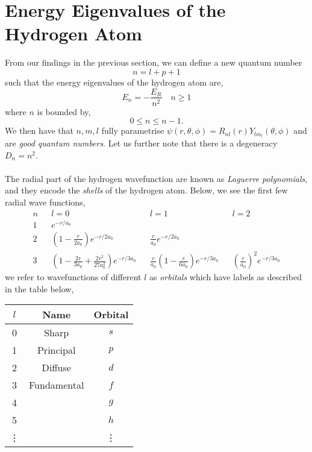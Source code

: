 \documentclass{book}
\begin{document}
\section{Energy Eigenvalues of the Hydrogen Atom}
From our findings in the previous section, we can define a new quantum number
\begin{equation}
	n = l + p + 1
\end{equation}
such that the energy eigenvalues of the hydrogen atom are,
\begin{equation}
	E_n = -\frac{E_R}{n^2} \hspace{1em} n \geq 1
\end{equation}
where $n$ is bounded by,
\begin{equation}
	 0 \leq n \leq n - 1.
\end{equation}
We then have that $n,m,l$ fully parametrise $\psi(r,\theta,\phi) = R_{nl}(r)Y_{lm_l}(\theta,\phi)$ and are \textit{good quantum numbers}. Let us further note that there is a degeneracy $D_n = n^2$.
\\\\
The radial part of the hydrogen wavefunction are known as \textit{Laguerre polynomials}, and they encode the \textit{shells} of the hydrogen atom. Below, we see the first few radial wave functions,
\begin{align*}
	n && l = 0 && l = 1 && l = 2 \\
	1 && e^{-r/a_0} && && \\
	2 && \left(1 - \frac{r}{2a_0}\right)e^{-r/2a_0} && \frac{r}{a_0}e^{-r/2a_0} && \\
	3 && \left(1 - \frac{2r}{3a_0} + \frac{2r^2}{27a_0^2}\right)e^{-r/3a_0} && \frac{r}{a_0}\left(1 - \frac{r}{6a_0}\right)e^{-r/3a_0} && \left(\frac{r}{a_0}\right) ^2e^{-r/3a_0}
\end{align*}
we refer to wavefunctions of different $l$ as \textit{orbitals} which have labels as described in the table below,
\begin{center}
	\begin{tabular}{|c|c|c|}
		\hline
		$l$ & Name & Orbital \\
		\hline
		0 & Sharp & $s$ \\
		1 & Principal & $p$ \\
		2 & Diffuse & $d$ \\
		3 & Fundamental & $f$ \\
		4 & & $g$ \\ 
		5 & & $h$ \\
		\vdots & & \vdots \\
		\hline
	\end{tabular}
\end{center}
\end{document}
